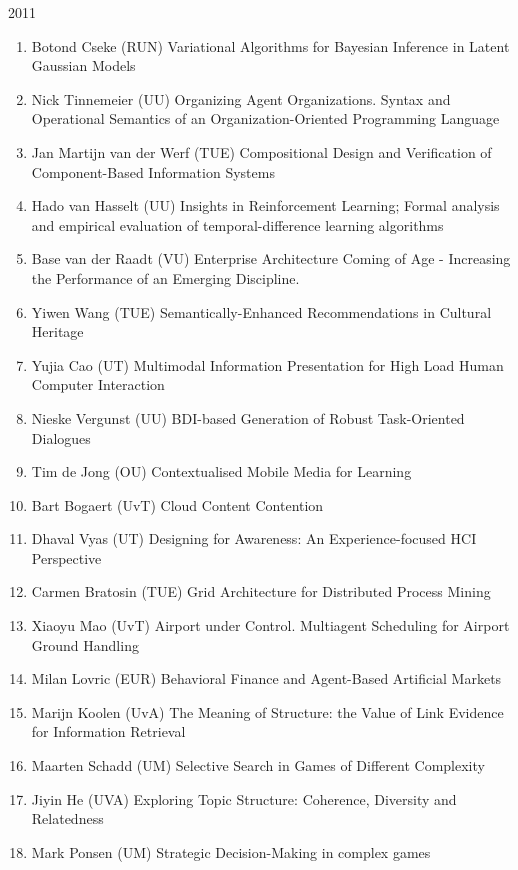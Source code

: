 \begin{multicols}{2}
\begin{scriptsize}
2011
\begin{enumerate}[leftmargin=*,noitemsep,topsep=0pt,parsep=1pt,partopsep=0pt]
\renewcommand{\labelenumi}{2011-\arabic{enumi}}
\item Botond Cseke (RUN) Variational Algorithms for Bayesian Inference in Latent Gaussian Models
\item Nick Tinnemeier (UU) Organizing Agent Organizations. Syntax and Operational Semantics of an Organization-Oriented Programming Language
\item Jan Martijn van der Werf (TUE) Compositional Design and Verification of Component-Based Information Systems
\item Hado van Hasselt (UU) Insights in Reinforcement Learning; Formal analysis and empirical evaluation of temporal-difference learning algorithms
\item Base van der Raadt (VU) Enterprise Architecture Coming of Age - Increasing the Performance of an Emerging Discipline.
\item Yiwen Wang (TUE) Semantically-Enhanced Recommendations in Cultural Heritage
\item Yujia Cao (UT) Multimodal Information Presentation for High Load Human Computer Interaction
\item Nieske Vergunst (UU) BDI-based Generation of Robust Task-Oriented Dialogues
\item Tim de Jong (OU) Contextualised Mobile Media for Learning
\item Bart Bogaert (UvT) Cloud Content Contention
\item Dhaval Vyas (UT) Designing for Awareness: An Experience-focused HCI Perspective
\item Carmen Bratosin (TUE) Grid Architecture for Distributed Process Mining
\item Xiaoyu Mao (UvT) Airport under Control. Multiagent Scheduling for Airport Ground Handling
\item Milan Lovric (EUR) Behavioral Finance and Agent-Based Artificial Markets
\item Marijn Koolen (UvA) The Meaning of Structure: the Value of Link Evidence for Information Retrieval
\item Maarten Schadd (UM) Selective Search in Games of Different Complexity
\item Jiyin He (UVA) Exploring Topic Structure: Coherence, Diversity and Relatedness
\item Mark Ponsen (UM) Strategic Decision-Making in complex games 

\end{enumerate}
\end{scriptsize}
\end{multicols}
